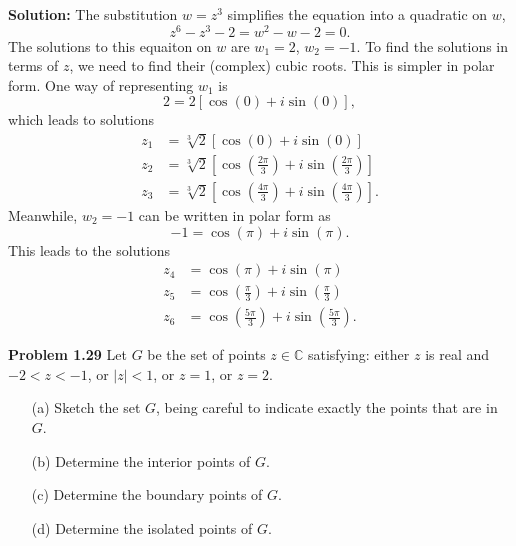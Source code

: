 \documentclass[12pt,oneside]{exam}
\newenvironment{exercise}[1]{\vspace{.1in}\noindent\textbf{Problem #1 \hspace{.05em}}}{}
\begin{document}
\noindent \textbf{Solution:} The substitution $w=z^3$ simplifies the equation into a quadratic on $w$, 
\begin{equation*}
z^6-z^3-2 = w^2-w-2 = 0.
\end{equation*}
The solutions to this equaiton on $w$ are $w_1 =2$, $w_2 = -1$. To find the solutions in terms of $z$, we need to find their (complex) cubic roots. This is simpler in polar form. One way of representing $w_1$ is
\begin{equation*}
2 = 2[\cos(0) + i\sin(0)],
\end{equation*}
which leads to solutions
\begin{align*}
z_1 & = \sqrt[3]{2} \left[\cos(0) + i\sin(0)  \right] \\
z_2 & = \sqrt[3]{2} \left[ \cos \left(\frac{2\pi}{3}\right)+i\sin\left(\frac{2\pi}{3} \right)\right]  \\
z_3 & = \sqrt[3]{2} \left[ \cos \left(\frac{4\pi}{3}\right) + i \sin \left(\frac{4\pi}{3}\right) \right].
\end{align*}
Meanwhile, $w_2=-1$ can be written in polar form as 
\begin{equation*}
-1 = \cos(\pi)+i\sin(\pi).
\end{equation*}
This leads to the solutions
\begin{align*}
z_4 & = \cos(\pi)+i\sin(\pi) \\
z_5 & = \cos\left( \frac{\pi}{3}\right)+ i \sin \left( \frac{\pi}{3}\right) \\
z_6 & = \cos \left( \frac{5\pi}{3} \right) + i \sin\left(\frac{5\pi}{3}\right).
\end{align*}

\vspace{1cm}

\begin{exercise}{1.29}
Let $G$ be the set of points $z \in \mathbb{C}$ satisfying: either $z$ is real and $-2 < z < -1$, or $|z|<1$, or $z=1$, or $z=2$.
\begin{itemize}
\item[(a)] Sketch the set $G$, being careful to indicate exactly the points that are in $G$. 
\item[(b)] Determine the interior points of $G$.
\item[(c)] Determine the boundary points of $G$.
\item[(d)] Determine the isolated points of $G$.
\end{itemize}
\end{exercise}
\end{document}
